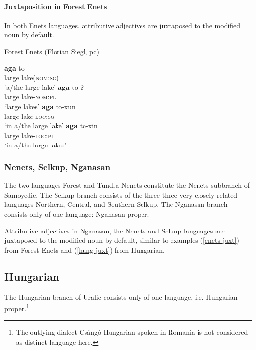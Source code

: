 \paragraph*{Juxtaposition in Forest Enets}
In both Enets languages, attributive adjectives are juxtaposed to the modified noun by default.
\begin{exe}
\label{enets juxt}%
\ex \rm{Forest Enets (Florian Siegl, pc)}
\begin{xlist}
\ex 
\gll	\textbf{aga} to\\
	large lake(\textsc{nom:sg})\\
\glt	‘a/the large lake’
\ex 
\gll	\textbf{aga} to-ʔ\\
	large lake\textsc{-nom:pl}\\
\glt	‘large lakes’
\ex 
\gll	\textbf{aga} to-xun\\
	large lake\textsc{-loc:sg}\\
\glt	‘in a/the large lake’
\ex 
\gll	\textbf{aga} to-xin\\
	large lake\textsc{-loc:pl}\\
\glt	‘in a/the large lakes’
\end{xlist}
\end{exe}

\subsubsection{Nenets, Selkup, Nganasan}
The two languages Forest and Tundra Nenets constitute the Nenets subbranch of Samoyedic. The Selkup branch consists of the three three very closely related languages Northern, Central, and Southern Selkup. The Nganasan branch consists only of one language: Nganasan proper.

Attributive adjectives in Nganasan, the Nenets and Selkup languages are juxtaposed to the modified noun by default, similar to examples (\ref{enets juxt}) from Forest Enets and (\ref{hung juxt}) from Hungarian.

\subsection{Hungarian}
The Hungarian branch of Uralic consists only of one language, i.e. Hungarian proper.\footnote{The outlying dialect Csángó Hungarian spoken in Romania is not considered as distinct language here.}

